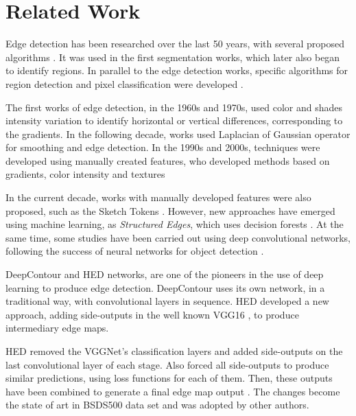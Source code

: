 \section{Related Work}
\label{cap4_trab_rel}

Edge detection has been researched over the last 50 years, with several proposed algorithms \cite{RCF:2017:8100105}. 
It was used in the first segmentation works, which later also began to identify regions.
In parallel to the edge detection works, specific algorithms for region detection and pixel classification were developed \cite{pedrini2008analise}.

The first works of edge detection, in the 1960s and 1970s, used color and shades intensity variation to identify horizontal or vertical differences, corresponding to the gradients.
In the following decade, works used Laplacian of Gaussian operator for smoothing and edge detection.
In the 1990s and 2000s, techniques were developed using manually created features, who developed methods based on gradients, color intensity and textures \cite{pedrini2008analise} %

In the current decade, works with manually developed features were also proposed, such as the Sketch Tokens \cite{LIM:6619250}. 
However, new approaches have emerged using machine learning, as \textit{Structured Edges}, which uses decision forests \cite{StructuredEdges:2015}.
At the same time, some studies have been carried out using deep convolutional networks, following the success of neural networks for object detection \cite{Segnet:2017:7803544}.

DeepContour \cite{DeepContour:2015:7299024} and HED \cite{Xie:2017:HED:3158436.3158453} networks, are one of the pioneers in the use of deep learning to produce edge detection.
DeepContour uses its own network, in a traditional way, with convolutional layers in sequence.
HED developed a new approach, adding side-outputs in the well known VGG16 \cite{VGGNET:2014}, to produce intermediary edge maps.

HED removed the VGGNet's classification layers and added side-outputs on the last convolutional layer of each stage.
Also forced all side-outputs to produce similar predictions, using loss functions for each of them.
Then, these outputs have been combined to generate a final edge map output \cite{Xie:2017:HED:3158436.3158453}.
The changes become the state of art in BSDS500 data set \cite{amfm_pami2011} and was adopted by other authors.

